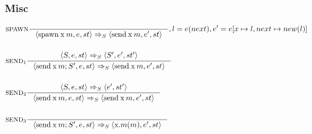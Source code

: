 \subsubsection{Misc}
\newcommand{\Tspawn}{\mathbin{\text{spawn}}}
\newcommand{\Tsend}{\mathbin{\text{send}}}
\begin{align*}
&\inference[$\text{SPAWN}$]{}
                       {\Braket{\Tspawn \Tx m,e,st} \Rightarrow_S \Braket{\Tsend \Tx m,e',st}}
												{, l = e(next), e' = e[x\mapsto l, next\mapsto new(l)]}
\\\\
&\inference[$\text{SEND}_1$]{\Braket{S,e,st} \Rightarrow_S \Braket{S',e',st'}}
                       {\Braket{\Tsend \Tx m ; S',e,st} \Rightarrow_S \Braket{\Tsend \Tx m,e',st}}
\\\\
&\inference[$\text{SEND}_2$]{\Braket{S,e,st} \Rightarrow_S \Braket{e',st'}}
                       {\Braket{\Tsend \Tx m,e,st} \Rightarrow_S \Braket{\Tsend \Tx m,e',st}}
\\\\
&\inference[$\text{SEND}_3$]{}
                       {\Braket{\Tsend \Tx m ; S',e,st} \Rightarrow_S \Braket{\Tx.m(m),e',st}}
\end{align*}